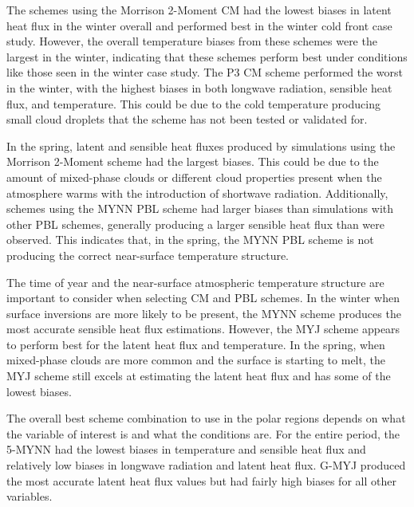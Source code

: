 The schemes using the Morrison 2-Moment CM had the lowest biases in latent heat flux in the winter overall and performed best in the winter cold front case study. However, the overall temperature biases from these schemes were the largest in the winter, indicating that these schemes perform best under conditions like those seen in the winter case study. The P3 CM scheme performed the worst in the winter, with the highest biases in both longwave radiation, sensible heat flux, and temperature. This could be due to the cold temperature producing small cloud droplets that the scheme has not been tested or validated for. 

In the spring, latent and sensible heat fluxes produced by simulations using the Morrison 2-Moment scheme had the largest biases. This could be due to the amount of mixed-phase clouds or different cloud properties present when the atmosphere warms with the introduction of shortwave radiation. Additionally, schemes using the MYNN PBL scheme had larger biases than simulations with other PBL schemes, generally producing a larger sensible heat flux than were observed. This indicates that, in the spring, the MYNN PBL scheme is not producing the correct near-surface temperature structure. 

The time of year and the near-surface atmospheric temperature structure are important to consider when selecting CM and PBL schemes. In the winter when surface inversions are more likely to be present, the MYNN scheme produces the most accurate sensible heat flux estimations. However, the MYJ scheme appears to perform best for the latent heat flux and temperature. In the spring, when mixed-phase clouds are more common and the surface is starting to melt, the MYJ scheme still excels at estimating the latent heat flux and has some of the lowest biases. 

The overall best scheme combination to use in the polar regions depends on what the variable of interest is and what the conditions are. For the entire period, the 5-MYNN had the lowest biases in temperature and sensible heat flux and relatively low biases in longwave radiation and latent heat flux. G-MYJ produced the most accurate latent heat flux values but had fairly high biases for all other variables. 
